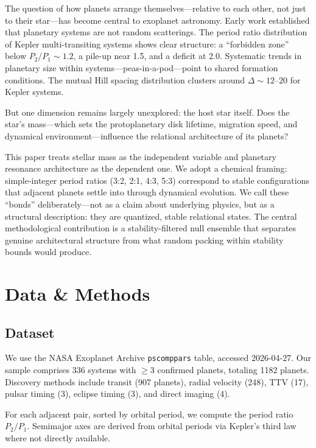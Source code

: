 \documentclass[twocolumn]{aastex631}
\begin{document}
The question of how planets arrange themselves---relative to each other, not
just to their star---has become central to exoplanet astronomy. Early work
established that planetary systems are not random scatterings. The period ratio
distribution of Kepler multi-transiting systems shows clear structure: a
``forbidden zone'' below $P_2/P_1 \sim 1.2$, a pile-up near 1.5, and a deficit
at 2.0\citep{fabrycky2014,fang_margot_2012}. Systematic trends in planetary
size within systems---peas-in-a-pod---point to shared formation
conditions\citep{weiss2018,millholland2021}. The mutual Hill spacing
distribution clusters around $\Delta \sim 12$--$20$ for Kepler
systems\citep{puwu2015,fang_margot_2013}.

But one dimension remains largely unexplored: the host star itself. Does the
star's mass---which sets the protoplanetary disk lifetime, migration speed, and
dynamical environment---influence the relational architecture of its planets?

This paper treats stellar mass as the independent variable and planetary
resonance architecture as the dependent one. We adopt a chemical framing:
simple-integer period ratios (3:2, 2:1, 4:3, 5:3) correspond to stable
configurations that adjacent planets settle into through dynamical evolution.
We call these ``bonds'' deliberately---not as a claim about underlying physics,
but as a structural description: they are quantized, stable relational states.
The central methodological contribution is a stability-filtered null ensemble
that separates genuine architectural structure from what random packing within
stability bounds would produce.

\section{Data \& Methods}
\label{sec:methods}

\subsection{Dataset}

We use the NASA Exoplanet Archive \texttt{pscomppars} table, accessed 2026-04-27.
Our sample comprises 336 systems with $\geq 3$ confirmed planets, totaling 1182
planets. Discovery methods include transit (907 planets), radial velocity (248),
TTV (17), pulsar timing (3), eclipse timing (3), and direct imaging (4).

For each adjacent pair, sorted by orbital period, we compute the period ratio
$P_2/P_1$. Semimajor axes are derived from orbital periods via Kepler's third
law where not directly available.
\end{document}
